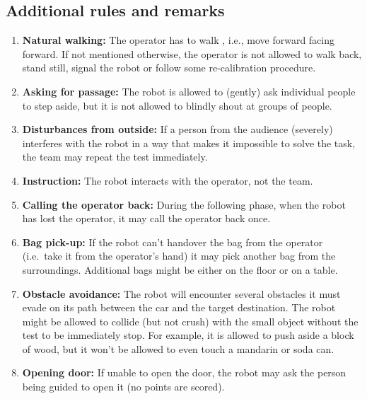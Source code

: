 \subsection{Additional rules and remarks}
\begin{enumerate}
  \item \textbf{Natural walking:} The operator has to walk , i.e., move forward facing forward. If not mentioned otherwise, the operator is not allowed to walk back, stand still, signal the robot or follow some re-calibration procedure.

  \item \textbf{Asking for passage:} The robot is allowed to (gently) ask individual people to step aside, but it is not allowed to blindly shout at groups of people.

  \item \textbf{Disturbances from outside:} If a person from the audience (severely) interferes with the robot in a way that makes it impossible to solve the task, the team may repeat the test immediately.

  \item \textbf{Instruction:} The robot interacts with the operator, not the team.

  \item \textbf{Calling the operator back:} During the following phase, when the robot has lost the operator, it may call the operator back once.

  \item \textbf{Bag pick-up:} If the robot can't handover the bag from the operator (i.e.~take it from the operator's hand) it may pick another bag from the surroundings. Additional bags might be either on the floor or on a table.

  \item \textbf{Obstacle avoidance:} The robot will encounter several obstacles it must evade on its path between the car and the target destination.
  The robot might be allowed to collide (but not crush) with the small object without the test to be immediately stop. For example, it is allowed to push aside a block of wood, but it won't be allowed to even touch a mandarin or soda can.

  \item \textbf{Opening door:} If unable to open the door, the robot may ask the person being guided to open it (no points are scored).

\end{enumerate}


